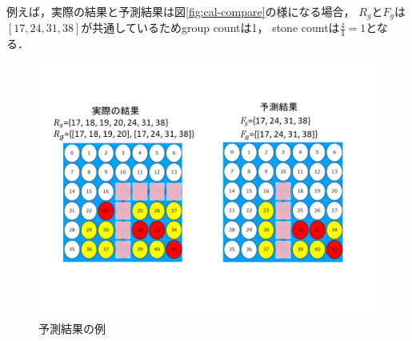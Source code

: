 例えば，実際の結果と予測結果は図\ref{fig:cal-compare}の様になる場合， $R_g$と$F_g$は$[17, 24, 31, 38]$が共通しているためgroup countは1， stone countは$\frac{4}{4}=1$となる．
\begin{figure}[t]
	\centering
	\includegraphics[width=\linewidth]{./figure/cal-compare.png}
	\caption{予測結果の例}
	\label{fig:fatalGroup}
\end{figure}


